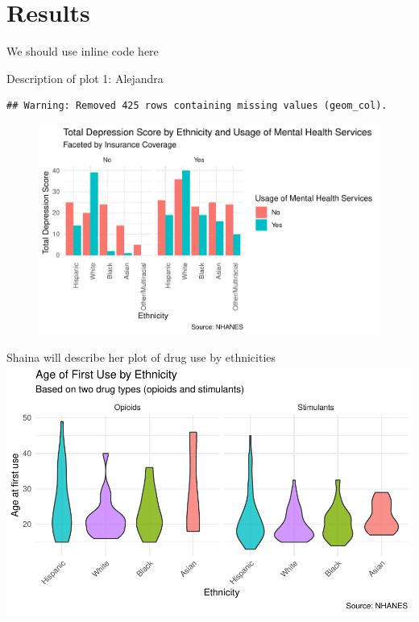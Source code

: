 \documentclass[man]{apa6}
\begin{document}
\section{Results}\label{results}

We should use inline code here

Description of plot 1: Alejandra

\begin{verbatim}
## Warning: Removed 425 rows containing missing values (geom_col).
\end{verbatim}

\begin{figure}
\centering
\includegraphics{Final_Paper_Group_3_files/figure-latex/plot1-1.pdf}
\caption{}
\end{figure}

Shaina will describe her plot of drug use by ethnicities
\includegraphics{Final_Paper_Group_3_files/figure-latex/ST_plot1-1.pdf}
\end{document}
